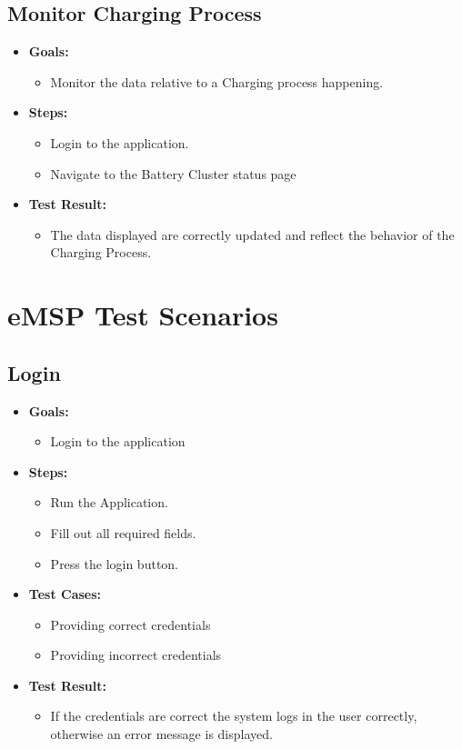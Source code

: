 \documentclass{Configuration_Files/PoliMi3i_thesis}
\begin{document}
\subsection{Monitor Charging Process}
\begin{itemize}
    \item\textbf{Goals:}
        \begin{itemize}
            \item Monitor the data relative to a Charging process happening. 
       \end{itemize}
    \item \textbf{Steps:}
        \begin{itemize}
            \item Login to the application.
            \item Navigate to the Battery Cluster status page
        \end{itemize}
    \item\textbf{Test Result:}
        \begin{itemize}
            \item The data displayed are correctly updated and reflect the behavior of the Charging Process. 
    \end{itemize}
\end{itemize}

\section {eMSP Test Scenarios}

\subsection{Login}
\begin{itemize}
    \item\textbf{Goals:}
        \begin{itemize}
            \item Login to the application
       \end{itemize}
    \item \textbf{Steps:}
        \begin{itemize}
            \item Run the Application. 
            \item Fill out all required fields. 
            \item Press the login button. 
        \end{itemize}
    \item \textbf{Test Cases:}
        \begin{itemize}
            \item Providing correct credentials
            \item Providing incorrect credentials 
        \end{itemize}
    \item\textbf{Test Result:}
        \begin{itemize}
            \item If the credentials are correct the system logs in the user correctly, otherwise an error message is displayed. 
        \end{itemize}
\end{itemize}
\end{document}
